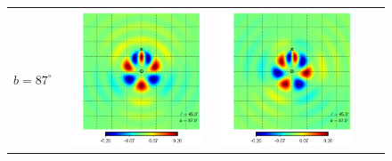 \documentclass[a4paper,11pt]{article}
\begin{document}
\begin{figure}[!t]
\begin{center}
\begin{tabular}{m{8ex}m{}m{}|m{}m{}}
$b=87^\circ$&
\hspace{\kernelfigspace}\includegraphics[width=\kernelfigwidth]{qu2ebqu_rker_D_lat87_lon45.pdf} &
\hspace{\kernelfigspace}\includegraphics[width=\kernelfigwidth]{qu2ebqu_iker_D_lat87_lon45.pdf} &

\end{tabular}
\end{center}
\end{figure}
\end{document}
